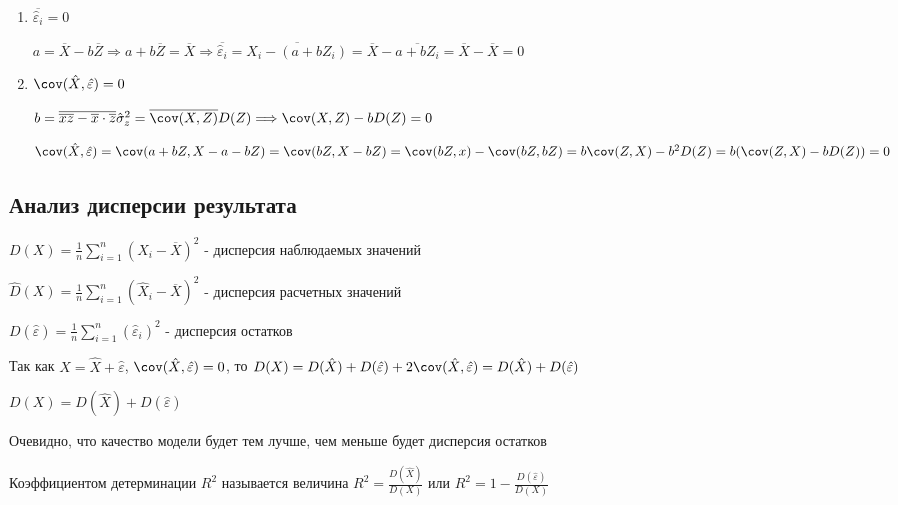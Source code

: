 \documentclass[12pt]{article}
\begin{document}
\begin{enumerate}
    \item $\overline{\hat \varepsilon_i} = 0$

    \begin{MyProof}
        $a = \overline{X} - b \overline{Z} \Longrightarrow a + b \overline{Z} = \overline{X} \Longrightarrow \overline{\hat \varepsilon_i} = \overline{X_i - (a + b Z_i)} = \overline{X} - \overline{a + b Z_i} = \overline{X} - \overline{X} = 0$
    \end{MyProof}

    \item $\cov (\hat X, \hat \varepsilon) = 0$

    \begin{MyProof}
        $b = \overline{\overline{xz} - \overline{x} \cdot \overline{z}}{\hat \sigma^2_z} = \overline{\cov (X, Z)}{D(Z)} \Longrightarrow \cov (X, Z) - b D(Z) = 0$

        $\cov (\hat X, \hat \varepsilon) = \cov (a + b Z, X - a - bZ) = \cov (bZ, X - bZ) = \cov (bZ, x) - \cov (bZ, bZ) = b \cov (Z, X) - b^2 D(Z) = b (\cov (Z, X) - b D(Z)) = 0$
    \end{MyProof}
\end{enumerate}

\subsection{Анализ дисперсии результата}

\Def $D(X) = \frac{1}{n} \sum_{i = 1}^n (X_i - \overline{X})^2$ - дисперсия наблюдаемых значений

\Defs $\hat D(X) = \frac{1}{n} \sum_{i = 1}^n (\hat X_i - \overline{X})^2$ - дисперсия расчетных значений

\Defs $D(\hat \varepsilon) = \frac{1}{n} \sum_{i = 1}^n (\hat \varepsilon_i)^2$ - дисперсия остатков

Так как $X = \hat X + \hat \varepsilon$, $\cov (\hat X, \hat \varepsilon) = 0$, то $D(X) = D(\hat X) + D(\hat \varepsilon) + 2\cov (\hat X, \hat \varepsilon) = D(\hat X) + D(\hat \varepsilon)$

\begin{MyTheorem}
    \Ths $D(X) = D(\hat X) + D(\hat \varepsilon)$
\end{MyTheorem}

Очевидно, что качество модели будет тем лучше, чем меньше будет дисперсия остатков

\Def Коэффициентом детерминации $R^2$ называется величина $R^2 = \frac{D(\hat X)}{D(X)}$ или $R^2 = 1 - \frac{D(\hat \varepsilon)}{D(X)}$
\end{document}
